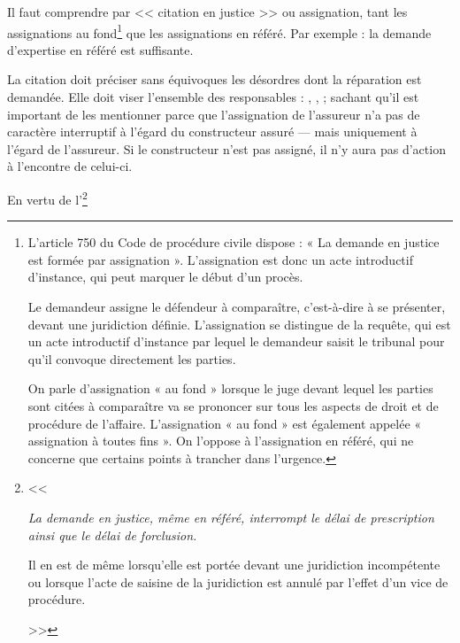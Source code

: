 				Il faut comprendre par << citation en justice >> ou assignation, tant les assignations au fond\footnote{
					L’article 750 du Code de procédure civile dispose : « La demande en justice est formée par assignation \lips ». L’assignation est donc un acte introductif d’instance, qui peut marquer le début d’un procès.

					Le demandeur assigne le défendeur à comparaître, c’est-à-dire à se présenter, devant une juridiction définie. L’assignation se distingue de la requête, qui est un acte introductif d’instance par lequel le demandeur saisit le tribunal pour qu’il convoque directement les parties.

					On parle d’assignation « au fond » lorsque le juge devant lequel les parties sont citées à comparaître va se prononcer sur tous les aspects de droit et de procédure de l’affaire. L’assignation « au fond » est également appelée « assignation à toutes fins ». On l’oppose à l’assignation en référé, qui ne concerne que certains points à trancher dans l’urgence.
				}
				que les assignations en référé.  Par exemple : la demande d'expertise en référé est suffisante.

				La citation doit préciser sans équivoques les désordres dont la réparation est demandée. Elle doit viser l'ensemble des responsables : \E, \archi, \Moe ; sachant qu'il est important de les mentionner parce que l'assignation de l'assureur n'a pas de caractère interruptif à l'égard du constructeur assuré --- mais uniquement à l'égard de l'assureur. Si le constructeur n'est pas assigné, il n'y aura pas d'action à l'encontre de celui-ci.

				En vertu de l'\footnote{<< {\itshape La demande en justice, même en référé, interrompt le délai de prescription ainsi que le délai de forclusion.

					Il en est de même lorsqu'elle est portée devant une juridiction incompétente ou lorsque l'acte de saisine de la juridiction est annulé par l'effet d'un vice de procédure.} >>}

